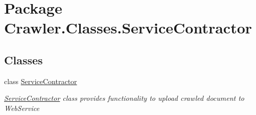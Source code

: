 \hypertarget{namespace_crawler_1_1_classes_1_1_service_contractor}{\section{Package Crawler.\-Classes.\-Service\-Contractor}
\label{namespace_crawler_1_1_classes_1_1_service_contractor}
}
\subsection*{Classes}
\begin{DoxyCompactItemize}
\item 
class \hyperlink{class_crawler_1_1_classes_1_1_service_contractor_1_1_service_contractor}{Service\-Contractor}
\begin{DoxyCompactList}\small\item\em \hyperlink{class_crawler_1_1_classes_1_1_service_contractor_1_1_service_contractor}{Service\-Contractor} class provides functionality to upload crawled document to Web\-Service \end{DoxyCompactList}\end{DoxyCompactItemize}
